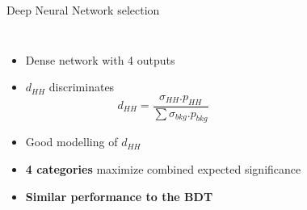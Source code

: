\begin{frame}{Deep Neural Network selection}
\begin{columns}
\begin{itemize}
    \item Dense network with 4 outputs
    \item $d_{HH}$ discriminates
    \begin{equation*}
        d_{HH} = \frac{\sigma_{HH}.p_{HH}}{\sum{\sigma_{bkg}.p_{bkg}}}
    \end{equation*}
    \item Good modelling of $d_{HH}$
    \item \textbf{\textcolor{HHred}{4 categories}} maximize combined expected significance 
    \item \textbf{\textcolor{HHturquoise_d}{Similar performance to the BDT}}
\end{itemize}
\end{columns}
\end{frame}


